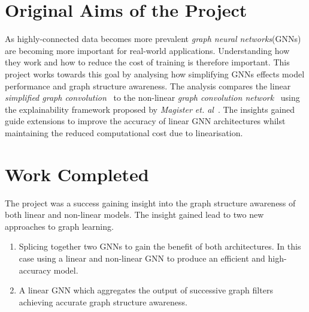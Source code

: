 \documentclass[12pt,a4paper,openany,openright]{report}
\begin{document}

\section*{Original Aims of the Project}

As highly-connected data becomes more prevalent \emph{graph neural networks}(GNNs) are becoming more important for real-world applications. 
Understanding how they work and how to reduce the cost of training is therefore important.
This project works towards this goal by analysing how simplifying GNNs effects model performance and graph structure awareness.
The analysis compares the linear \emph{simplified graph convolution}~\cite{wu2019simplifying} to the non-linear \emph{graph convolution network}~\cite{kipf2016semi} using the explainability framework proposed by \textit{Magister et. al}~\cite{magister2021gcexplainer}.
The insights gained guide extensions to improve the accuracy of linear GNN architectures whilst maintaining the reduced computational cost due to linearisation.

\section*{Work Completed}

The project was a success gaining insight into the graph structure awareness of both linear and non-linear models.
The insight gained lead to two new approaches to graph learning.

\begin{enumerate}[nolistsep]
    \item Splicing together two GNNs to gain the benefit of both architectures. In this case using a linear and non-linear GNN to produce an efficient and high-accuracy model.
    \item A linear GNN which aggregates the output of successive graph filters achieving accurate graph structure awareness.
\end{enumerate}
\end{document}
